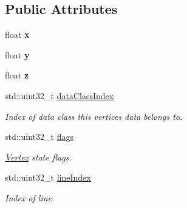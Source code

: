 \subsection*{Public Attributes}
\begin{DoxyCompactItemize}
\item 
float {\bfseries x}\hypertarget{struct_lots_of_lines_1_1_vertex_a3763bd4b8d3a32cebc6dfc99c5cebf4b}{}\label{struct_lots_of_lines_1_1_vertex_a3763bd4b8d3a32cebc6dfc99c5cebf4b}

\item 
float {\bfseries y}\hypertarget{struct_lots_of_lines_1_1_vertex_a48123278a323fed63e442f8854bf2947}{}\label{struct_lots_of_lines_1_1_vertex_a48123278a323fed63e442f8854bf2947}

\item 
float {\bfseries z}\hypertarget{struct_lots_of_lines_1_1_vertex_a152d16d21f3d761b4eb6683f9d93fe55}{}\label{struct_lots_of_lines_1_1_vertex_a152d16d21f3d761b4eb6683f9d93fe55}

\item 
std\+::uint32\+\_\+t \hyperlink{struct_lots_of_lines_1_1_vertex_af82ba390ca7177b67c293a18ea93e567}{data\+Class\+Index}\hypertarget{struct_lots_of_lines_1_1_vertex_af82ba390ca7177b67c293a18ea93e567}{}\label{struct_lots_of_lines_1_1_vertex_af82ba390ca7177b67c293a18ea93e567}

\begin{DoxyCompactList}\small\item\em Index of data class this vertice\textquotesingle{}s data belongs to. \end{DoxyCompactList}\item 
std\+::uint32\+\_\+t \hyperlink{struct_lots_of_lines_1_1_vertex_afc481025faf3d798a996a73c73c4da14}{flags}\hypertarget{struct_lots_of_lines_1_1_vertex_afc481025faf3d798a996a73c73c4da14}{}\label{struct_lots_of_lines_1_1_vertex_afc481025faf3d798a996a73c73c4da14}

\begin{DoxyCompactList}\small\item\em \hyperlink{struct_lots_of_lines_1_1_vertex}{Vertex} state flags. \end{DoxyCompactList}\item 
std\+::uint32\+\_\+t \hyperlink{struct_lots_of_lines_1_1_vertex_a219b266fe522f56ff9b861824b0cb9c6}{line\+Index}\hypertarget{struct_lots_of_lines_1_1_vertex_a219b266fe522f56ff9b861824b0cb9c6}{}\label{struct_lots_of_lines_1_1_vertex_a219b266fe522f56ff9b861824b0cb9c6}

\begin{DoxyCompactList}\small\item\em Index of line. \end{DoxyCompactList}\end{DoxyCompactItemize}


